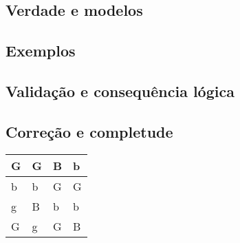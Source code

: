     \subsection{Verdade e modelos}
       
    \subsection{Exemplos}
    
    \subsection{Validação e consequência lógica}
    
    \subsection{Correção e completude}
    
    \begin{table}[htb]
      \centering
      \begin{tabular}{|l|l|l|l|}
      \hline
      G          & G          & B     &b           \\ \hline
      b          & b          & G     &G           \\ \hline
      g          & B          & b     &b            \\ \hline
      G          & g          & G     &B            \\ \hline
      
      \end{tabular}
      \end{table}
